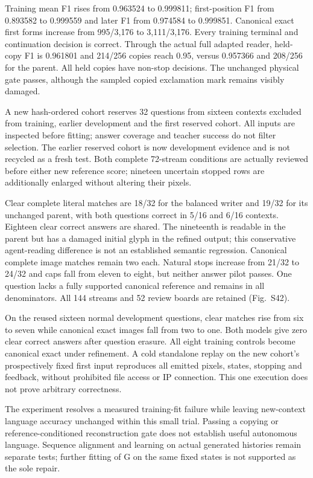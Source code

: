 Training mean F1 rises from 0.963524 to 0.999811; first-position F1 from 0.893582
to 0.999559 and later F1 from 0.974584 to 0.999851. Canonical exact first forms
increase from 995/3,176 to 3,111/3,176. Every training terminal and continuation
decision is correct. Through the actual full adapted reader, held-copy F1 is
0.961801 and 214/256 copies reach 0.95, versus 0.957366 and 208/256 for the
parent. All held copies have non-stop decisions. The unchanged physical gate
passes, although the sampled copied exclamation mark remains visibly damaged.

A new hash-ordered cohort reserves 32 questions from sixteen contexts excluded
from training, earlier development and the first reserved cohort. All inputs
are inspected before fitting; answer coverage and teacher success do not
filter selection. The earlier reserved cohort is now development evidence and
is not recycled as a fresh test. Both complete 72-stream conditions are
actually reviewed before either new reference score; nineteen uncertain
stopped rows are additionally enlarged without altering their pixels.

Clear complete literal matches are 18/32 for the balanced writer and 19/32 for
its unchanged parent, with both questions correct in 5/16 and 6/16 contexts.
Eighteen clear correct answers are shared. The nineteenth is readable in the
parent but has a damaged initial glyph in the refined output; this conservative
agent-reading difference is not an established semantic regression. Canonical
complete image matches remain two each. Natural stops increase from 21/32
to 24/32 and caps fall from eleven to eight, but neither answer pilot passes.
One question lacks a fully supported canonical reference and remains in all
denominators. All 144 streams and 52 review boards are retained (Fig.~S42).

On the reused sixteen normal development questions, clear matches rise from
six to seven while canonical exact images fall from two to one. Both models
give zero clear correct answers after question erasure. All eight training
controls become canonical exact under refinement. A cold standalone replay on
the new cohort's prospectively fixed first input reproduces all emitted pixels,
states, stopping and feedback, without prohibited file access or IP connection.
This one execution does not prove arbitrary correctness.

The experiment resolves a measured training-fit failure while leaving
new-context language accuracy unchanged within this small trial. Passing a
copying or reference-conditioned reconstruction gate does not establish useful
autonomous language. Sequence alignment and learning on actual generated
histories remain separate tests; further fitting of G on the same fixed states
is not supported as the sole repair.

